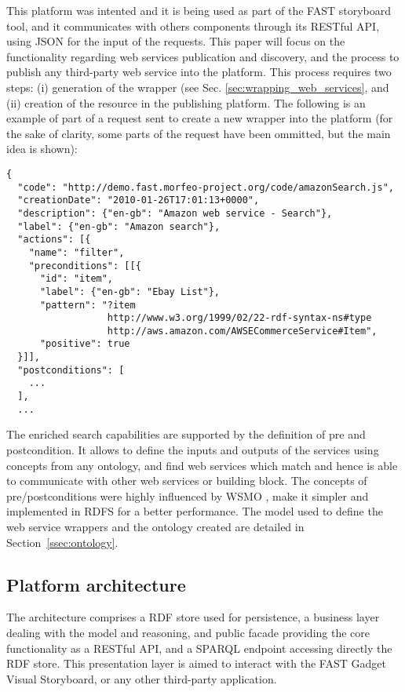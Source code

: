 This platform was intented and it is being used as part of the FAST storyboard tool, and it communicates with others components through its RESTful API, using JSON for the input of the requests. This paper will focus on the functionality regarding web services publication and discovery, and the process to publish any third-party web service into the platform. This process requires two steps: (i) generation of the wrapper (see Sec. \ref{sec:wrapping_web_services}, and (ii) creation of the resource in the publishing platform. The following is an example of part of a request sent to create a new wrapper into the platform (for the sake of clarity, some parts of the request have been ommitted, but the main idea is shown):

\begin{listing}
\begin{verbatim}
{
  "code": "http://demo.fast.morfeo-project.org/code/amazonSearch.js",
  "creationDate": "2010-01-26T17:01:13+0000",
  "description": {"en-gb": "Amazon web service - Search"},
  "label": {"en-gb": "Amazon search"},
  "actions": [{
    "name": "filter",
    "preconditions": [[{
      "id": "item",
      "label": {"en-gb": "Ebay List"},
      "pattern": "?item
                  http://www.w3.org/1999/02/22-rdf-syntax-ns#type
                  http://aws.amazon.com/AWSECommerceService#Item",
      "positive": true
  }]],
  "postconditions": [
    ...
  ],
  ...
\end{verbatim}
\label{lis:json_request}
\end{listing}

The enriched search capabilities are supported by the definition of pre and postcondition. It allows to define the inputs and outputs of the services using concepts from any ontology, and find web services which match and hence is able to communicate with other web services or building block. The concepts of pre/postconditions were highly influenced by WSMO \cite{roman2005}, make it simpler and implemented in RDFS for a better performance. The model used to define the web service wrappers and the ontology created are detailed in Section~\ref{ssec:ontology}.

\subsection{Platform architecture}
\label{ssec:architecture}

The architecture comprises a RDF store used for persistence, a business layer dealing with the model and reasoning, and public facade providing the core functionality as a RESTful API, and a SPARQL endpoint accessing directly the RDF store. This presentation layer is aimed to interact with the FAST Gadget Visual Storyboard, or any other third-party application.

